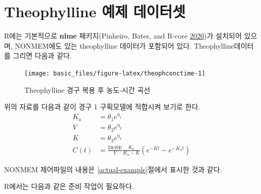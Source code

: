 \documentclass[
  10pt,
  krantz2,
  a4paper]{krantz}
\theoremstyle{definition}
\theoremstyle{definition}
\theoremstyle{definition}
\theoremstyle{remark}
\begin{document}
\hypertarget{Theoph}{%
\section{Theophylline 예제 데이터셋}\label{Theoph}}

R에는 기본적으로 \textbf{nlme} 패키지(Pinheiro, Bates, and R-core \protect\hyperlink{ref-R-nlme}{2020})가 설치되어 있으며, NONMEM에도 있는 theophylline 데이터가 포함되어 있다. Theophylline데이터를 그리면 다음과 같다.



\begin{figure}
\texttt{[image: basic\_files/figure-latex/theophconctime-1]} \caption{Theophylline 경구 복용 후 농도-시간 곡선}\label{fig:theophconctime}
\end{figure}

위의 자료를 다음과 같이 경구 1 구획모델에 적합시켜 보기로 한다.
\begin{equation}
\begin{split}
  K_{a} & = \theta_{1}e^{\eta_{1}} \\
  V & = \theta_{2}e^{\eta_{2}} \\
  K & = \theta_{3}e^{\eta_{3}} \\
  C(t) & = \frac{\text{DOSE}}{V}\frac{K_{a}}{K_{a} - K}(e^{- Kt} - e^{- K_{a}t})
\end{split}
\label{eq:onecompfit}
\end{equation}

NONMEM 제어파일의 내용은 \ref{actual-example}절에서 표시한 것과 같다.

R에서는 다음과 같은 준비 작업이 필요하다.
\end{document}
